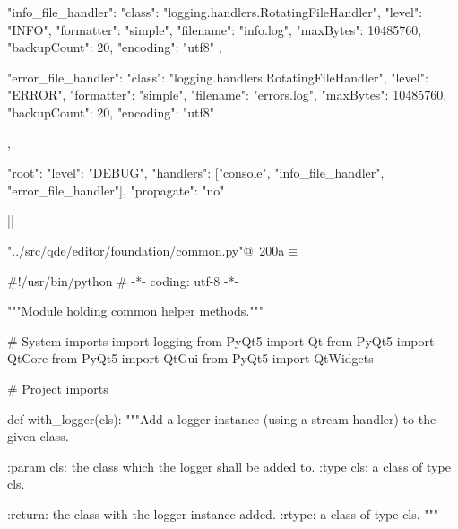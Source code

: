 \documentclass[%
    a4paper,    %
    justified,  %
    nobib,      %
    openany     %
]{tufte-book}
\makeatletter
\renewcommand{\label}[1]{\@tufte@label{##1}}%
\makeatother
\begin{document}
\begin{fullwidth}
\begin{flushleft}
\begin{minipage}{\linewidth}
\begin{pythoncode}
{{        "info_file_handler": {
            "class": "logging.handlers.RotatingFileHandler",
            "level": "INFO",
            "formatter": "simple",
            "filename": "info.log",
            "maxBytes": 10485760,
            "backupCount": 20,
            "encoding": "utf8"
        },

        "error_file_handler": {
            "class": "logging.handlers.RotatingFileHandler",
            "level": "ERROR",
            "formatter": "simple",
            "filename": "errors.log",
            "maxBytes": 10485760,
            "backupCount": 20,
            "encoding": "utf8"
        }
    },

    "root": {
        "level": "DEBUG",
        "handlers": ["console", "info_file_handler", "error_file_handler"],
        "propagate": "no"
    }
}|\NWsep|
\end{pythoncode}
\vspace{1.5ex}
\footnotesize
\begin{list}{}{\setlength{\itemsep}{-\parsep}\setlength{\itemindent}{-\leftmargin}}

\item{}
\end{list}
\end{minipage}\vspace{4ex}
\end{flushleft}

\begin{flushleft} \small
\begin{minipage}{\linewidth}\label{scrap192}\raggedright\small
{} \verb@"../src/qde/editor/foundation/common.py"@\nobreak\ {\footnotesize {200a}}$\equiv$
\vspace{-1ex}
\begin{pythoncode}
#!/usr/bin/python
# -*- coding: utf-8 -*-

"""Module holding common helper methods."""

# System imports
import logging
from PyQt5 import Qt
from PyQt5 import QtCore
from PyQt5 import QtGui
from PyQt5 import QtWidgets

# Project imports


def with_logger(cls):
    """Add a logger instance (using a stream handler) to the given class.

    :param cls: the class which the logger shall be added to.
    :type  cls: a class of type cls.

    :return: the class with the logger instance added.
    :rtype:  a class of type cls.
    """


\end{pythoncode}
\end{minipage}
\end{flushleft}
\end{fullwidth}
\end{document}
